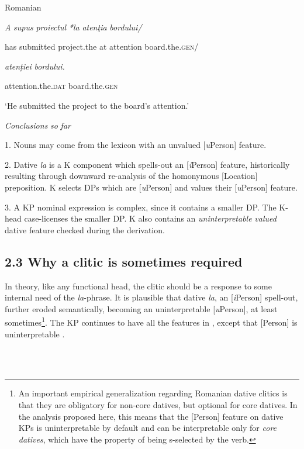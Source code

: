 \documentclass[output=paper,colorlinks,citecolor=brown]{./langscibook}
\begin{document}
          Romanian

\textit{A} \textit{supus}    \textit{proiectul}  \textit{*la} \textit{atenţia}   \textit{bordului/}

  has submitted  project.the  at attention   board.the.\textsc{gen}/ 

  \textit{atenției}      \textit{bordului.}

attention.the.\textsc{dat}  board.the.\textsc{gen}

  ‘He submitted the project to the board’s attention.’

\textit{Conclusions} \textit{so} \textit{far}

1. Nouns may come from the lexicon with an unvalued [\textit{u}Person] feature. 

2. Dative \textit{la} is a K component which spells-out an [\textit{i}Person] feature, historically resulting through downward re-analysis of the homonymous [Location] preposition. K selects DPs which are [\textit{u}Person] and values their [\textit{u}Person] feature.

3. A KP nominal expression is complex, since it contains a smaller DP. The K-head case-licenses the smaller DP. K also contains an \textit{uninterpretable} \textit{valued} dative feature checked during the derivation.

\subsection{\textbf{2.3} \textbf{Why} \textbf{a} \textbf{clitic} \textbf{is} \textbf{sometimes} \textbf{required}}

In theory, like any functional head, the clitic should be a response to some internal need of the \textit{la}{}-phrase. It is plausible that dative \textit{la}, an [\textit{i}Person] spell-out, further eroded semantically, becoming an uninterpretable [\textit{u}Person], at least sometimes\footnote{An important empirical generalization \citep{Cornilescu2017} regarding Romanian dative clitics is that they are obligatory for non-core datives, but optional for core datives. In the analysis proposed here, this means that the [Person] feature on dative KPs is uninterpretable by default and can be interpretable only for \textit{core} \textit{datives}, which have the property of being s-selected by the verb.}. The KP continues to have all the features in , except that [Person] is uninterpretable .

\ea%
    \label{ex:key:20}
    \gll\\
        \\
    \glt
    \z
\end{document}

